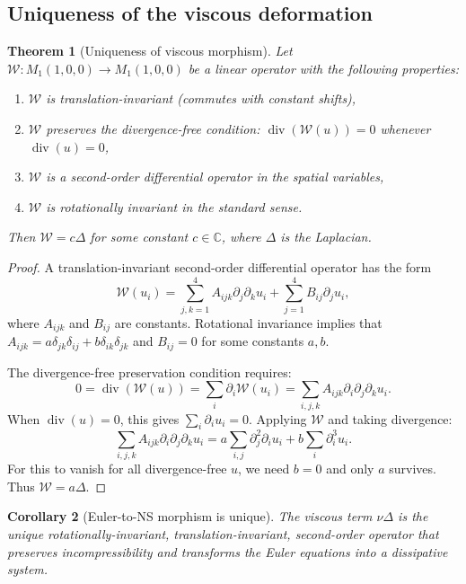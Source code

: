 \documentclass[reqno,10pt]{amsart}
\theoremstyle{plain}
\newtheorem{theorem}{Theorem}[section]
\newtheorem{corollary}[theorem]{Corollary}
\theoremstyle{definition}
\def\div{\operatorname{div}}
\begin{document}
\subsection{Uniqueness of the viscous deformation}

\begin{theorem}[Uniqueness of viscous morphism]\label{thm:unique-viscous}
Let $\mathcal{W}: M_1(1,0,0) \to M_1(1,0,0)$ be a linear operator with the following properties:
\begin{enumerate}
\item $\mathcal{W}$ is translation-invariant (commutes with constant shifts),
\item $\mathcal{W}$ preserves the divergence-free condition: $\div(\mathcal{W}(u))=0$ whenever $\div(u)=0$,
\item $\mathcal{W}$ is a second-order differential operator in the spatial variables,
\item $\mathcal{W}$ is rotationally invariant in the standard sense.
\end{enumerate}
Then $\mathcal{W} = c\Delta$ for some constant $c\in\mathbb{C}$, where $\Delta$ is the Laplacian.
\end{theorem}

\begin{proof}
A translation-invariant second-order differential operator has the form
\[
  \mathcal{W}(u_i) = \sum_{j,k=1}^4 A_{ijk}\partial_j\partial_k u_i + \sum_{j=1}^4 B_{ij}\partial_j u_i,
\]
where $A_{ijk}$ and $B_{ij}$ are constants. Rotational invariance implies that $A_{ijk} = a\delta_{jk}\delta_{ij} + b\delta_{ik}\delta_{jk}$ and $B_{ij}=0$ for some constants $a,b$.

The divergence-free preservation condition requires:
\[
  0 = \div(\mathcal{W}(u)) = \sum_i \partial_i\mathcal{W}(u_i) = \sum_{i,j,k} A_{ijk}\partial_i\partial_j\partial_k u_i.
\]
When $\div(u)=0$, this gives $\sum_i \partial_i u_i = 0$. Applying $\mathcal{W}$ and taking divergence:
\[
  \sum_{i,j,k} A_{ijk}\partial_i\partial_j\partial_k u_i = a\sum_{i,j}\partial_j^2\partial_i u_i + b\sum_i\partial_i^3 u_i.
\]
For this to vanish for all divergence-free $u$, we need $b=0$ and only $a$ survives. Thus $\mathcal{W} = a\Delta$.
\end{proof}

\begin{corollary}[Euler-to-NS morphism is unique]
The viscous term $\nu\Delta$ is the unique rotationally-invariant, translation-invariant, second-order operator that preserves incompressibility and transforms the Euler equations into a dissipative system.
\end{corollary}
\end{document}
